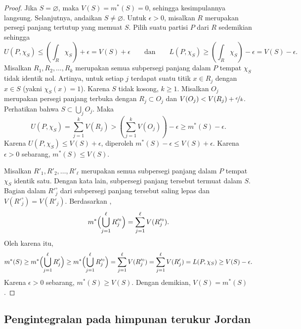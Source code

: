 \begin{proof}
Jika $S=\varnothing$, maka $V(S)=m^*(S)=0$, sehingga kesimpulannya langsung.
Selanjutnya, andaikan $S \neq \varnothing$. Untuk $\epsilon > 0$, misalkan
$R$ merupakan persegi panjang tertutup yang memuat $S$. Pilih suatu partisi
$P$ dari $R$ sedemikian sehingga
\begin{equation*}
U(P,\chi_S) \leq \left( \int_R \chi_S \right) + \epsilon = V(S) + \epsilon
\qquad \text{dan} \qquad
L(P,\chi_S) \geq \left( \int_R \chi_S \right) - \epsilon = V(S)-\epsilon.
\end{equation*}
Misalkan $R_1,R_2,\ldots,R_k$ merupakan semua subpersegi panjang dalam $P$
tempat $\chi_S$ tidak identik nol. Artinya, untuk setiap $j$ terdapat suatu
titik $x \in R_j$ dengan $x \in S$ (yakni $\chi_S(x)=1$). Karena $S$ tidak
kosong, $k \geq 1$. Misalkan $O_j$ merupakan persegi panjang terbuka dengan
$R_j \subset O_j$ dan
$V(O_j) < V(R_j) + \nicefrac{\epsilon}{k}$. Perhatikan bahwa
$S \subset \bigcup_j O_j$. Maka
\begin{equation*}
U(P,\chi_S) = \sum_{j=1}^k V(R_j) > 
\left(\sum_{j=1}^k V(O_j)\right) - \epsilon \geq m^*(S) - \epsilon .
\end{equation*}
Karena $U(P,\chi_S) \leq V(S) + \epsilon$, diperoleh
$m^*(S) - \epsilon \leq V(S) + \epsilon$. Karena $\epsilon>0$ sebarang,
$m^*(S) \leq V(S)$.

Misalkan $R'_1,R'_2,\ldots,R'_\ell$ merupakan semua subpersegi panjang dalam
$P$ tempat $\chi_S$ identik satu. Dengan kata lain, subpersegi panjang tersebut
termuat dalam $S$. Bagian dalam $R'^\circ_j$ dari subpersegi panjang tersebut
saling lepas dan $V(R'^\circ_j) = V(R'_j)$. Berdasarkan
,
\begin{equation*}
m^*\Bigl(\bigcup_{j=1}^\ell R'^\circ_j\Bigr)
=
\sum_{j=1}^\ell
V(R'^\circ_j) .
\end{equation*}
Oleh karena itu,
\begin{equation*}
m^*(S) \geq
m^*\Bigl(\bigcup_{j=1}^\ell R'_j\Bigr)
\geq
m^*\Bigl(\bigcup_{j=1}^\ell R'^\circ_j\Bigr)
=
\sum_{j=1}^\ell
V(R'^\circ_j)
=
\sum_{j=1}^\ell
V(R'_j)
=
L(P,\chi_S) \geq V(S) - \epsilon .
\end{equation*}
Karena $\epsilon>0$ sebarang, $m^*(S) \geq V(S)$. Dengan demikian,
$V(S)=m^*(S)$.
\end{proof}

\subsection{Pengintegralan pada himpunan terukur Jordan}

